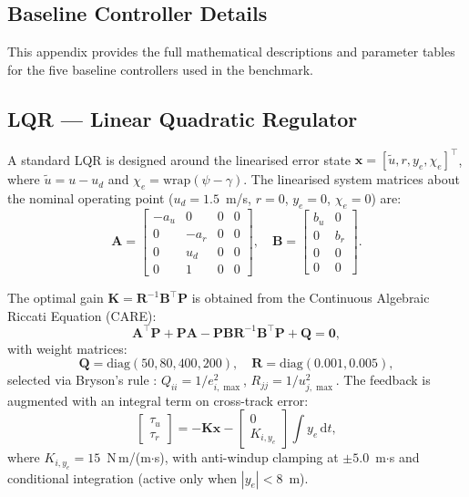 \documentclass[review]{cas-dc}
\begin{document}
\begin{appendices}
\section{Baseline Controller Details}
\label{sec:appendix}

This appendix provides the full mathematical descriptions and parameter tables for the five baseline controllers used in the benchmark.


\subsection{LQR --- Linear Quadratic Regulator}
\label{sec:app_lqr}

A standard LQR is designed around the linearised error state $\mathbf{x} = [\tilde{u}, r, y_e, \chi_e]^\top$, where $\tilde{u} = u - u_d$ and $\chi_e = \mathrm{wrap}(\psi - \gamma)$. The linearised system matrices about the nominal operating point ($u_d = 1.5$~m/s, $r = 0$, $y_e = 0$, $\chi_e = 0$) are:
\begin{equation}
\mathbf{A} = \begin{bmatrix} -a_u & 0 & 0 & 0 \\ 0 & -a_r & 0 & 0 \\ 0 & u_d & 0 & 0 \\ 0 & 1 & 0 & 0 \end{bmatrix}, \quad
\mathbf{B} = \begin{bmatrix} b_u & 0 \\ 0 & b_r \\ 0 & 0 \\ 0 & 0 \end{bmatrix}.
\label{eq:AB}
\end{equation}

The optimal gain $\mathbf{K} = \mathbf{R}^{-1}\mathbf{B}^\top\!\mathbf{P}$ is obtained from the Continuous Algebraic Riccati Equation (CARE):
\begin{equation}
\mathbf{A}^\top\!\mathbf{P} + \mathbf{P}\mathbf{A} - \mathbf{P}\mathbf{B}\mathbf{R}^{-1}\mathbf{B}^\top\!\mathbf{P} + \mathbf{Q} = \mathbf{0},
\label{eq:care}
\end{equation}
with weight matrices:
\begin{equation}
\mathbf{Q} = \mathrm{diag}(50, 80, 400, 200), \quad \mathbf{R} = \mathrm{diag}(0.001, 0.005),
\label{eq:QR}
\end{equation}
selected via Bryson's rule \citep{Bryson1975}: $Q_{ii} = 1/e_{i,\max}^2$, $R_{jj} = 1/u_{j,\max}^2$. The feedback is augmented with an integral term on cross-track error:
\begin{equation}
\begin{bmatrix} \tau_u \\ \tau_r \end{bmatrix} = -\mathbf{K}\mathbf{x} - \begin{bmatrix} 0 \\ K_{i,y_e} \end{bmatrix}\!\int\! y_e\,\mathrm{d}t,
\label{eq:lqr_law}
\end{equation}
where $K_{i,y_e} = 15$~N\,m/(m$\cdot$s), with anti-windup clamping at $\pm 5.0$~m$\cdot$s and conditional integration (active only when $|y_e| < 8$~m).


\end{appendices}
\end{document}
